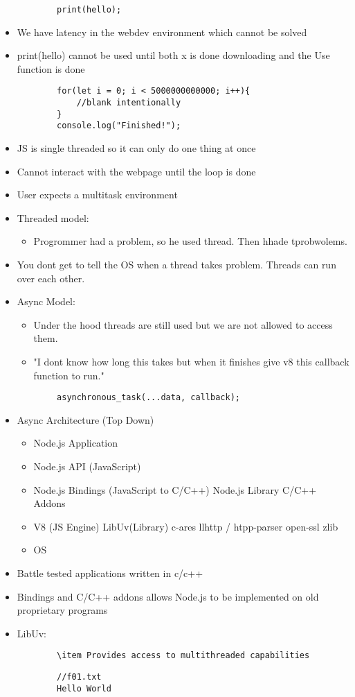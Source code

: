 \documentclass{article}
\begin{document}
\begin{itemize}
\begin{lstlisting}
        print(hello);
    \end{lstlisting}
    \item We have latency in the webdev environment which cannot be solved
    \item print(hello) cannot be used until both x is done downloading and the Use function is done
    \begin{lstlisting}
        for(let i = 0; i < 5000000000000; i++){
            //blank intentionally
        }
        console.log("Finished!");
    \end{lstlisting}
    \item JS is single threaded so it can only do one thing at once
    \item Cannot interact with the webpage until the loop is done
    \item User expects a multitask environment
    \item Threaded model:
    \begin{itemize}
        \item Progrommer had a problem, so he used thread. Then hhade tprobwolems.
    \end{itemize}
    \item You dont get to tell the OS when a thread takes problem. Threads can run over each other.
    \item Async Model:
    \begin{itemize}
        \item Under the hood threads are still used but we are not allowed to access them.
        \item "I dont know how long this takes but when it finishes give v8 this callback function to run."
    \end{itemize}
    \begin{lstlisting}
        asynchronous_task(...data, callback);
    \end{lstlisting}
    \item Async Architecture (Top Down)
    \begin{itemize}
        \item Node.js Application
        \item Node.js API (JavaScript)
        \item Node.js Bindings (JavaScript to C/C++) Node.js Library C/C++ Addons
        \item V8 (JS Engine) LibUv(Library) c-ares llhttp / htpp-parser open-ssl zlib
        \item OS
    \end{itemize}
    \item Battle tested applications written in c/c++ 
    \item Bindings and C/C++ addons allows Node.js to be implemented on old proprietary programs
    \item LibUv:
    \begin{lstlisting}
        \item Provides access to multithreaded capabilities
    \end{lstlisting}
    \begin{lstlisting}
        //f01.txt
        Hello World


\end{lstlisting}
\end{itemize}
\end{document}
